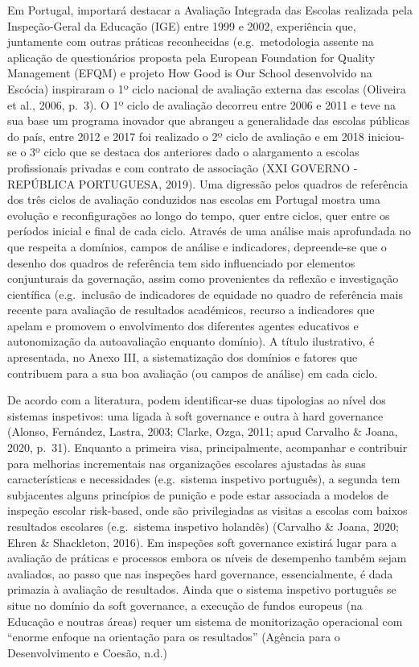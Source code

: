 \documentclass[
]{book}
\begin{document}
Em Portugal, importará destacar a Avaliação Integrada das Escolas realizada pela Inspeção-Geral da Educação (IGE) entre 1999 e 2002, experiência que, juntamente com outras práticas reconhecidas (e.g.~metodologia assente na aplicação de questionários proposta pela European Foundation for Quality Management (EFQM) e projeto How Good is Our School desenvolvido na Escócia) inspiraram o 1º ciclo nacional de avaliação externa das escolas (Oliveira et al., 2006, p.~3). O 1º ciclo de avaliação decorreu entre 2006 e 2011 e teve na sua base um programa inovador que abrangeu a generalidade das escolas públicas do país, entre 2012 e 2017 foi realizado o 2º ciclo de avaliação e em 2018 iniciou-se o 3º ciclo que se destaca dos anteriores dado o alargamento a escolas profissionais privadas e com contrato de associação (XXI GOVERNO - REPÚBLICA PORTUGUESA, 2019). Uma digressão pelos quadros de referência dos três ciclos de avaliação conduzidos nas escolas em Portugal mostra uma evolução e reconfigurações ao longo do tempo, quer entre ciclos, quer entre os períodos inicial e final de cada ciclo. Através de uma análise mais aprofundada no que respeita a domínios, campos de análise e indicadores, depreende-se que o desenho dos quadros de referência tem sido influenciado por elementos conjunturais da governação, assim como provenientes da reflexão e investigação científica (e.g.~inclusão de indicadores de equidade no quadro de referência mais recente para avaliação de resultados académicos, recurso a indicadores que apelam e promovem o envolvimento dos diferentes agentes educativos e autonomização da autoavaliação enquanto domínio). A título ilustrativo, é apresentada, no Anexo III, a sistematização dos domínios e fatores que contribuem para a sua boa avaliação (ou campos de análise) em cada ciclo.

De acordo com a literatura, podem identificar-se duas tipologias ao nível dos sistemas inspetivos: uma ligada à soft governance e outra à hard governance (Alonso, Fernández, Lastra, 2003; Clarke, Ozga, 2011; apud Carvalho \& Joana, 2020, p.~31). Enquanto a primeira visa, principalmente, acompanhar e contribuir para melhorias incrementais nas organizações escolares ajustadas às suas características e necessidades (e.g.~sistema inspetivo português), a segunda tem subjacentes alguns princípios de punição e pode estar associada a modelos de inspeção escolar risk-based, onde são privilegiadas as visitas a escolas com baixos resultados escolares (e.g.~sistema inspetivo holandês) (Carvalho \& Joana, 2020; Ehren \& Shackleton, 2016). Em inspeções soft governance existirá lugar para a avaliação de práticas e processos embora os níveis de desempenho também sejam avaliados, ao passo que nas inspeções hard governance, essencialmente, é dada primazia à avaliação de resultados. Ainda que o sistema inspetivo português se situe no domínio da soft governance, a execução de fundos europeus (na Educação e noutras áreas) requer um sistema de monitorização operacional com ``enorme enfoque na orientação para os resultados'' (Agência para o Desenvolvimento e Coesão, n.d.)
\end{document}
